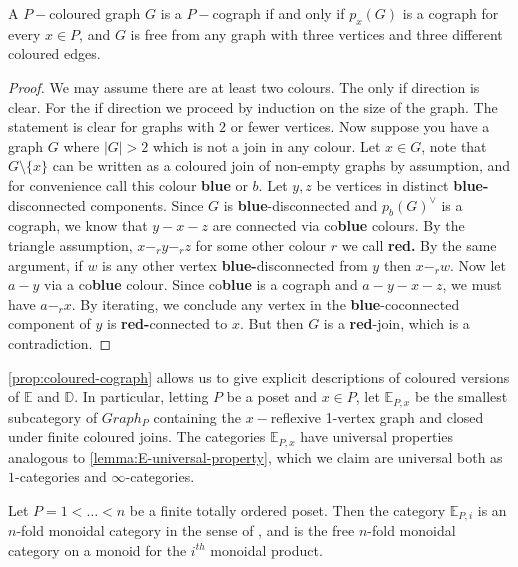 \begin{proposition}\label{prop:coloured-cograph}
    A $P-$coloured graph $G$ is a $P-$cograph if and only if $p_x(G)$ is a cograph for every $x\in P$, and $G$ is free from any graph with three vertices and three different coloured edges.
\end{proposition}
\begin{proof}
     We may assume there are at least two colours. The only if direction is clear. For the if direction we proceed by induction on the size of the graph. The statement is clear for graphs with $2$ or fewer vertices. Now suppose you have a graph $G$ where $|G|>2$ which is not a join in any colour. Let $x\in G$, note that $G\setminus \{x\}$ can be written as a coloured join of non-empty graphs by assumption, and for convenience call this colour \textbf{blue} or $b$. Let $y,z$ be vertices in distinct \textbf{blue-}disconnected components. Since $G$ is \textbf{blue}-disconnected and $p_{b}(G)^\vee$ is a cograph, we know that $y-x-z$ are connected via co\textbf{blue} colours. By the triangle assumption, $x-_r y-_rz$ for some other colour $r$ we call \textbf{red.} By the same argument, if $w$ is any other vertex \textbf{blue-}disconnected from $y$ then $x-_rw$. Now let $a-y$ via a co\textbf{blue} colour. Since co\textbf{blue} is a cograph and $a-y-x-z$, we must have $a-_rx$. By iterating, we conclude any vertex in the \textbf{blue}-coconnected component of $y$ is \textbf{red-}connected to $x$. But then $G$ is a \textbf{red}-join, which is a contradiction.
\end{proof}

\begin{remark}\cref{prop:coloured-cograph} allows us to give explicit descriptions of coloured versions of $\mathbb{E}$ and $\mathbb{D}$. In particular, letting $P$ be a poset and $x\in P$, let $\mathbb{E}_{P,x}$ be the smallest subcategory of $Graph_P$ containing the $x-$reflexive 1-vertex graph and closed under finite coloured joins. The categories $\mathbb{E}_{P,x}$ have universal properties analogous to \cref{lemma:E-universal-property}, which we claim are universal both as $1$-categories and $\infty$-categories.
\end{remark}

\begin{proposition}
Let $P=1<\dots<n$ be a finite totally ordered poset. Then the category $\mathbb{E}_{P,i}$ is an $n$-fold monoidal category in the sense of \cite{Balteanu-Fiedorowicz-Schwaenzl-Vogt}, and is the free $n$-fold monoidal category on a monoid for the $i^{th}$ monoidal product.
\end{proposition}

